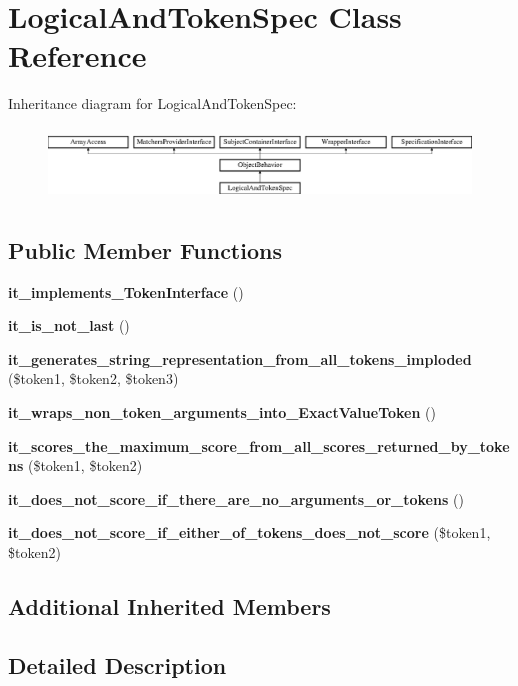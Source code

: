 \section{Logical\+And\+Token\+Spec Class Reference}
\label{classspec_1_1_prophecy_1_1_argument_1_1_token_1_1_logical_and_token_spec}
Inheritance diagram for Logical\+And\+Token\+Spec\+:\begin{figure}[H]
\begin{center}
\leavevmode
\includegraphics[height=1.953488cm]{classspec_1_1_prophecy_1_1_argument_1_1_token_1_1_logical_and_token_spec}
\end{center}
\end{figure}
\subsection*{Public Member Functions}
\begin{DoxyCompactItemize}
\item 
{\bf it\+\_\+implements\+\_\+\+Token\+Interface} ()
\item 
{\bf it\+\_\+is\+\_\+not\+\_\+last} ()
\item 
{\bf it\+\_\+generates\+\_\+string\+\_\+representation\+\_\+from\+\_\+all\+\_\+tokens\+\_\+imploded} (\$token1, \$token2, \$token3)
\item 
{\bf it\+\_\+wraps\+\_\+non\+\_\+token\+\_\+arguments\+\_\+into\+\_\+\+Exact\+Value\+Token} ()
\item 
{\bf it\+\_\+scores\+\_\+the\+\_\+maximum\+\_\+score\+\_\+from\+\_\+all\+\_\+scores\+\_\+returned\+\_\+by\+\_\+tokens} (\$token1, \$token2)
\item 
{\bf it\+\_\+does\+\_\+not\+\_\+score\+\_\+if\+\_\+there\+\_\+are\+\_\+no\+\_\+arguments\+\_\+or\+\_\+tokens} ()
\item 
{\bf it\+\_\+does\+\_\+not\+\_\+score\+\_\+if\+\_\+either\+\_\+of\+\_\+tokens\+\_\+does\+\_\+not\+\_\+score} (\$token1, \$token2)
\end{DoxyCompactItemize}
\subsection*{Additional Inherited Members}


\subsection{Detailed Description}


